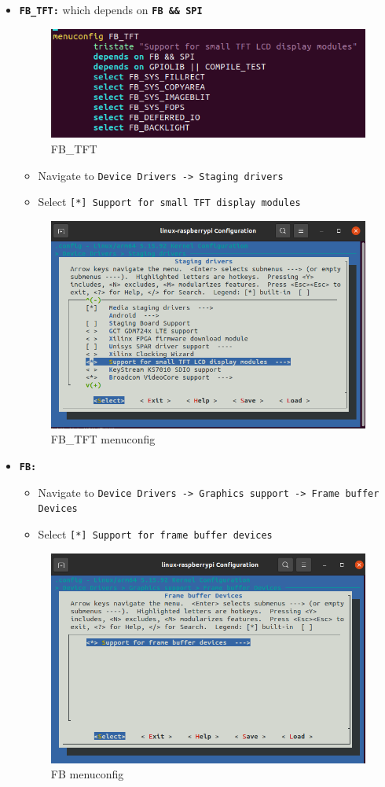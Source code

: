 \documentclass{article}
\begin{document}
\begin{itemize}
\begin{itemize}
        \item \texttt{\textbf{FB\_TFT:}} which depends on \texttt{\textbf{FB \&\& SPI}}
        \begin{figure}[H]
            \centering
            \includegraphics[width=0.5\linewidth]{FB_TFT.png}
            \caption{FB\_TFT}
            \label{fig:fb_tft}
        \end{figure}
        \begin{itemize}
            \item Navigate to \texttt{Device Drivers -> Staging drivers}
            \item Select \texttt{[*] Support for small TFT display modules}
        \end{itemize}
        \begin{figure}[H]
            \centering
            \includegraphics[width=0.5\linewidth]{FB_TFT_menuconfig.png}
            \caption{FB\_TFT menuconfig}
            \label{fig:fb_tft_menuconfig}
        \end{figure}

        \item \texttt{\textbf{FB:}}
        \begin{itemize}
            \item Navigate to \texttt{Device Drivers -> Graphics support -> Frame buffer Devices}
            \item Select \texttt{[*] Support for frame buffer devices}
        \end{itemize}
        \begin{figure}[H]
            \centering
            \includegraphics[width=0.5\linewidth]{FB_menuconfig.png}
            \caption{FB menuconfig}
            \label{fig:fb_menuconfig}
        \end{figure}


\end{itemize}
\end{itemize}
\end{document}
